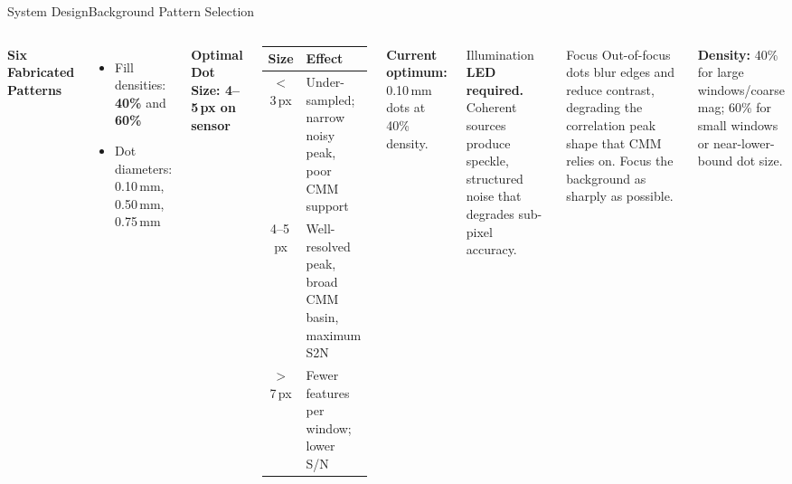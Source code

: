 \documentclass[9pt, aspectratio=169]{beamer}
\newcommand{\theadrow}{\rowcolor{accentlight}}
\begin{document}
\begin{frame}{System Design}{Background Pattern Selection}
  \begin{columns}[t]
     
    \vspace{0.25cm}
      \textbf{Six Fabricated Patterns}
      \begin{itemize}
        \item Fill densities: \textbf{40\%} and \textbf{60\%}
        \item Dot diameters: 0.10\,mm, 0.50\,mm, 0.75\,mm
      \end{itemize}
      \vspace{0.35em}
      \textbf{Optimal Dot Size: 4--5\,px on sensor}
      \begin{center}
        \small
        \begin{tabular}{cp{5.5cm}}
          \toprule
          \theadrow Size & Effect \\
          \midrule
          $<$3\,px & Under-sampled; narrow noisy peak, poor CMM support \\
          4--5\,px & Well-resolved peak, broad CMM basin, maximum S2N \\
          $>$7\,px & Fewer features per window; lower S/N \\
          \bottomrule
        \end{tabular}
      \end{center}
      \vspace{0.25em}
      \textbf{Current optimum:} 0.10\,mm dots at 40\% density.
    
    \vspace{-0.3cm}
      \begin{alertblock}{Illumination}
        \textbf{LED required.} Coherent sources produce speckle, structured noise that degrades sub-pixel accuracy.
      \end{alertblock}
      \vspace{0.3em}
      \begin{alertblock}{Focus}
        Out-of-focus dots blur edges and reduce contrast, degrading the correlation peak shape that CMM relies on. Focus the background as sharply as possible.
      \end{alertblock}
      \vspace{0.3em}
      \small \textbf{Density:} 40\% for large windows/coarse mag; 60\% for small windows or near-lower-bound dot size.
  \end{columns}
\end{frame}
\end{document}
